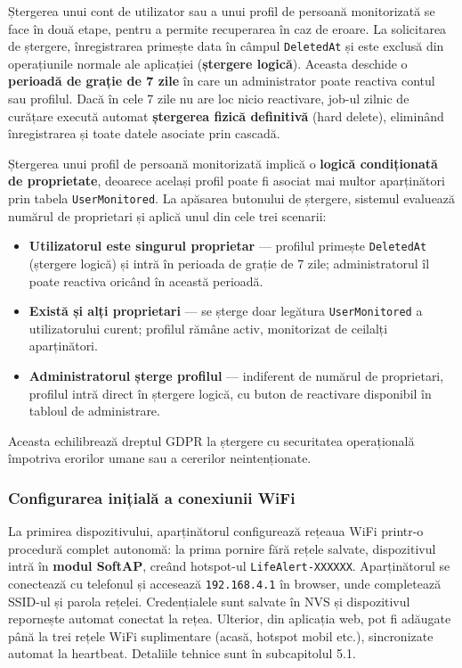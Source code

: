\documentclass[12pt,a4paper,twoside]{article}
\begin{document}
Ștergerea unui cont de utilizator sau a unui profil de persoană monitorizată se face în două etape, pentru a permite recuperarea în caz de eroare. La solicitarea de ștergere, înregistrarea primește data în câmpul \texttt{DeletedAt} și este exclusă din operațiunile normale ale aplicației (\textbf{ștergere logică}). Aceasta deschide o \textbf{perioadă de grație de 7 zile} în care un administrator poate reactiva contul sau profilul. Dacă în cele 7 zile nu are loc nicio reactivare, job-ul zilnic de curățare execută automat \textbf{ștergerea fizică definitivă} (hard delete), eliminând înregistrarea și toate datele asociate prin cascadă.

Ștergerea unui profil de persoană monitorizată implică o \textbf{logică condiționată de proprietate}, deoarece același profil poate fi asociat mai multor aparținători prin tabela \texttt{UserMonitored}. La apăsarea butonului de ștergere, sistemul evaluează numărul de proprietari și aplică unul din cele trei scenarii:

\begin{itemize}[leftmargin=1.5em]
\item \textbf{Utilizatorul este singurul proprietar} — profilul primește \texttt{DeletedAt} (ștergere logică) și intră în perioada de grație de 7 zile; administratorul îl poate reactiva oricând în această perioadă.
\item \textbf{Există și alți proprietari} — se șterge doar legătura \texttt{UserMonitored} a utilizatorului curent; profilul rămâne activ, monitorizat de ceilalți aparținători.
\item \textbf{Administratorul șterge profilul} — indiferent de numărul de proprietari, profilul intră direct în ștergere logică, cu buton de reactivare disponibil în tabloul de administrare.
\end{itemize}

Aceasta echilibrează dreptul GDPR la ștergere cu securitatea operațională împotriva erorilor umane sau a cererilor neintenționate.

\subsubsection{Configurarea inițială a conexiunii WiFi}

La primirea dispozitivului, aparținătorul configurează rețeaua WiFi printr-o procedură complet autonomă: la prima pornire fără rețele salvate, dispozitivul intră în \textbf{modul SoftAP}, creând hotspot-ul \texttt{LifeAlert-XXXXXX}. Aparținătorul se conectează cu telefonul și accesează \texttt{192.168.4.1} în browser, unde completează SSID-ul și parola rețelei. Credențialele sunt salvate în NVS și dispozitivul repornește automat conectat la rețea. Ulterior, din aplicația web, pot fi adăugate până la trei rețele WiFi suplimentare (acasă, hotspot mobil etc.), sincronizate automat la heartbeat. Detaliile tehnice sunt în subcapitolul 5.1.
\end{document}
